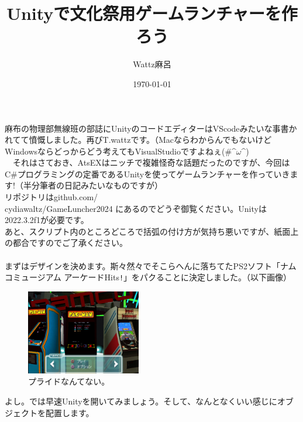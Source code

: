 \documentclass[b5paper,9pt,platex,dvipdfmx]{jsarticle}
\begin{document}
\title{Unityで文化祭用ゲームランチャーを作ろう}
\author{Wattz麻呂}
\date{\today}
\maketitle
\thispagestyle{empty}


\begin{multicols}{3}
麻布の物理部無線班の部誌にUnityのコードエディターはVScodeみたいな事書かれてて憤慨しました。再びT.wattzです。（MacならわからんでもないけどWindowsならどっからどう考えてもVisualStudioですよねぇ(\#\textasciicircum$ \omega$\textasciicircum)\\
　それはさておき、AtsEXはニッチで複雑怪奇な話題だったのですが、今回はC\#プログラミングの定番であるUnityを使ってゲームランチャーを作っていきます!（半分筆者の日記みたいなものですが）\\
リポジトリはgithub.com/\\cydiawaltz/GameLuncher2024 にあるのでどうぞ御覧ください。Unityは2022.3.2f1が必要です。\\
あと、スクリプト内のところどころで括弧の付け方が気持ち悪いですが、紙面上の都合ですのでご了承ください。\\
\\
まずはデザインを決めます。斯々然々でそこらへんに落ちてたPS2ソフト「ナムコミュージアム アーケードHits\verb|!|」をパクることに決定しました。（以下画像）\\
\begin{figure}[H]
  \centering
  \includegraphics[width=5cm]{1.png}
  \caption{プライドなんてない。}
\end{figure}
よし。では早速Unityを開いてみましょう。そして、なんとなくいい感じにオブジェクトを配置します。\\

\end{multicols}
\end{document}
